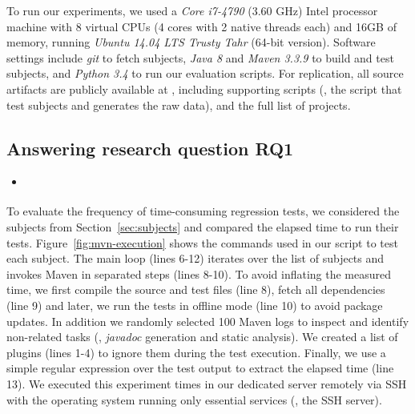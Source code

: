 To run our experiments, we used a \emph{Core i7-4790} (3.60 GHz) Intel
processor machine with 8 virtual CPUs (4 cores with 2 native threads
each) and 16GB of memory, running \emph{Ubuntu 14.04 LTS Trusty Tahr}
(64-bit version). Software settings include \emph{git} to fetch
subjects, \emph{Java 8} and \emph{Maven 3.3.9} to build and test subjects,
and \emph{Python 3.4} to run our evaluation scripts. For replication,
all source artifacts are publicly available at ,
including supporting scripts (\eg, the script that test subjects and
generates the raw data), and the full list of projects. 

\subsection{Answering research question RQ1}
\label{sec:rqone}

\begin{itemize}
    \item \emph{\RQA}
\end{itemize}

To evaluate the frequency of time-consuming regression tests, we
considered the \numSubjs{} subjects from Section~\ref{sec:subjects} and
compared the elapsed time to run their tests.
Figure~\ref{fig:mvn-execution} shows the commands used in our script
to test each subject. The main loop (lines 6-12) iterates over the
list of subjects and invokes Maven in separated steps (lines 8-10). To
avoid inflating the measured time, we first compile the source and
test files (line 8), fetch all dependencies (line 9) and later, we run
the tests in offline mode (line 10) to avoid package updates. In
addition we randomly selected 100 Maven logs to inspect and identify
non-related tasks (\eg, \emph{javadoc} generation and static
analysis). We created a list of plugins (lines 1-4) to ignore them
during the test execution.  Finally, we use a simple regular
expression over the test output to extract the elapsed time (line 13).
We executed this experiment  times in our dedicated server
remotely via SSH with the operating system running only essential
services (\eg, the SSH server). 

